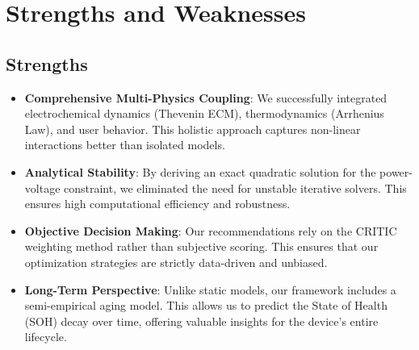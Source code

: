 \documentclass{mcmthesis}
\begin{document}
\section{Strengths and Weaknesses}

\subsection{Strengths}
\begin{itemize}
    \item \textbf{Comprehensive Multi-Physics Coupling}: We successfully integrated electrochemical dynamics (Thevenin ECM), thermodynamics (Arrhenius Law), and user behavior. This holistic approach captures non-linear interactions better than isolated models.
    \item \textbf{Analytical Stability}: By deriving an exact quadratic solution for the power-voltage constraint, we eliminated the need for unstable iterative solvers. This ensures high computational efficiency and robustness.
    \item \textbf{Objective Decision Making}: Our recommendations rely on the CRITIC weighting method rather than subjective scoring. This ensures that our optimization strategies are strictly data-driven and unbiased.
    \item \textbf{Long-Term Perspective}: Unlike static models, our framework includes a semi-empirical aging model. This allows us to predict the State of Health (SOH) decay over time, offering valuable insights for the device's entire lifecycle.
\end{itemize}
\end{document}
